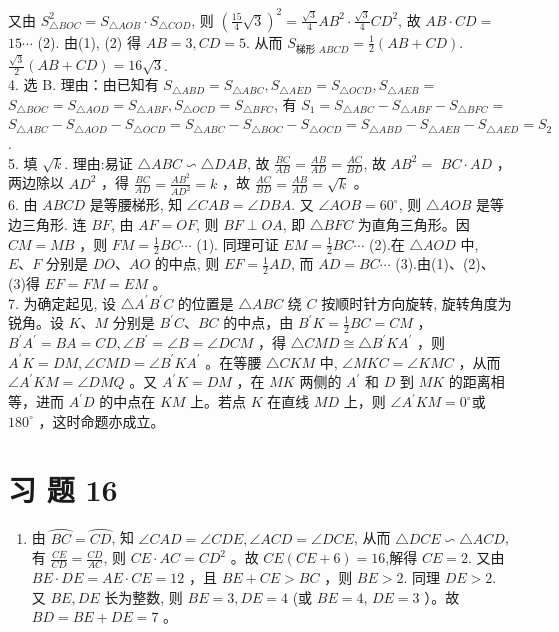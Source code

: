 \documentclass[10pt]{article}
\begin{document}
又由 $S_{\triangle B O C}^{2}=S_{\triangle A O B} \cdot S_{\triangle C O D}$, 则 $\left(\frac{15}{4} \sqrt{3}\right)^{2}=\frac{\sqrt{3}}{4} A B^{2} \cdot \frac{\sqrt{3}}{4} C D^{2}$, 故 $A B \cdot C D=$ $15 \cdots$ (2). 由(1), (2) 得 $A B=3, C D=5$. 从而 $S_{\text {梯形 } A B C D}=\frac{1}{2}(A B+C D)$. $\frac{\sqrt{3}}{2}(A B+C D)=16 \sqrt{3}$.\\
4. 选 B. 理由：由已知有 $S_{\triangle A B D}=S_{\triangle A B C}, S_{\triangle A E D}=S_{\triangle O C D}, S_{\triangle A E B}=$ $S_{\triangle B O C}=S_{\triangle A O D}=S_{\triangle A B F}, S_{\triangle O C D}=S_{\triangle B F C}$, 有 $S_{1}=S_{\triangle A B C}-S_{\triangle A B F}-S_{\triangle B F C}=$ $S_{\triangle A B C}-S_{\triangle A O D}-S_{\triangle O C D}=S_{\triangle A B C}-S_{\triangle B O C}-S_{\triangle O C D}=S_{\triangle A B D}-S_{\triangle A E B}-S_{\triangle A E D}=S_{2}$.\\
5. 填 $\sqrt{k}$. 理由:易证 $\triangle A B C \backsim \triangle D A B$, 故 $\frac{B C}{A B}=\frac{A B}{A D}=\frac{A C}{B D}$, 故 $A B^{2}=$ $B C \cdot A D$ ，两边除以 $A D^{2}$ ，得 $\frac{B C}{A D}=\frac{A B^{2}}{A D^{2}}=k$ ，故 $\frac{A C}{B D}=\frac{A B}{A D}=\sqrt{k}$ 。\\
6. 由 $A B C D$ 是等腰梯形, 知 $\angle C A B=\angle D B A$. 又 $\angle A O B=60^{\circ}$, 则 $\triangle A O B$ 是等边三角形. 连 $B F$, 由 $A F=O F$, 则 $B F \perp O A$, 即 $\triangle B F C$ 为直角三角形。因 $C M=M B$ ，则 $F M=\frac{1}{2} B C \cdots$ (1). 同理可证 $E M=\frac{1}{2} B C \cdots$ (2).在 $\triangle A O D$ 中, $E 、 F$ 分别是 $D O 、 A O$ 的中点, 则 $E F=\frac{1}{2} A D$, 而 $A D=B C \cdots$ (3).由(1)、(2)、(3)得 $E F=F M=E M$ 。\\
7. 为确定起见, 设 $\triangle A^{\prime} B^{\prime} C$ 的位置是 $\triangle A B C$ 绕 $C$ 按顺时针方向旋转, 旋转角度为锐角。设 $K 、 M$ 分别是 $B^{\prime} C 、 B C$ 的中点，由 $B^{\prime} K=\frac{1}{2} B C=C M$ ， $B^{\prime} A^{\prime}=B A=C D, \angle B^{\prime}=\angle B=\angle D C M$ ，得 $\triangle C M D \cong \triangle B^{\prime} K A^{\prime}$ ，则 $A^{\prime} K=D M, \angle C M D=\angle B^{\prime} K A^{\prime}$ 。在等腰 $\triangle C K M$ 中, $\angle M K C=\angle K M C$ ，从而 $\angle A^{\prime} K M=\angle D M Q$ 。又 $A^{\prime} K=D M$ ，在 $M K$ 两侧的 $A^{\prime}$ 和 $D$ 到 $M K$ 的距离相等，进而 $A^{\prime} D$ 的中点在 $K M$ 上。若点 $K$ 在直线 $M D$ 上，则 $\angle A^{\prime} K M=0^{\circ}$或 $180^{\circ}$ ，这时命题亦成立。

\section*{习 题 16}
\begin{enumerate}
  \item 由 $\overparen{B C}=\overparen{C D}$, 知 $\angle C A D=\angle C D E, \angle A C D=\angle D C E$, 从而 $\triangle D C E \backsim \triangle A C D$, 有 $\frac{C E}{C D}=\frac{C D}{A C}$, 则 $C E \cdot A C=C D^{2}$ 。故 $C E(C E+6)=16$,解得 $C E=2$. 又由 $B E \cdot D E=A E \cdot C E=12$ ，且 $B E+C E>B C$ ，则 $B E>2$. 同理 $D E>2$. 又 $B E, D E$ 长为整数, 则 $B E=3, D E=4$ (或 $B E=4$, $D E=3$ ）。故 $B D=B E+D E=7$ 。
\end{enumerate}
\end{document}
